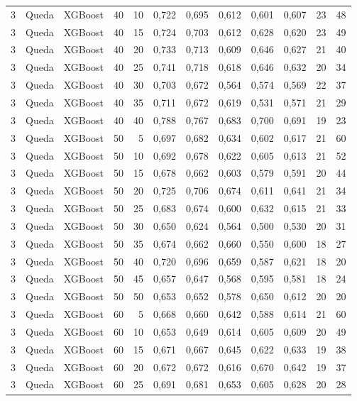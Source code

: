 \begin{longtable}{@{}rllrrrrrrrrr@{}}
3 & Queda & XGBoost & 40 & 10 & 0,722 & 0,695 & 0,612 & 0,601 & 0,607 & 23 & 48 \\
3 & Queda & XGBoost & 40 & 15 & 0,724 & 0,703 & 0,612 & 0,628 & 0,620 & 23 & 49 \\
3 & Queda & XGBoost & 40 & 20 & 0,733 & 0,713 & 0,609 & 0,646 & 0,627 & 21 & 40 \\
3 & Queda & XGBoost & 40 & 25 & 0,741 & 0,718 & 0,618 & 0,646 & 0,632 & 20 & 34 \\
3 & Queda & XGBoost & 40 & 30 & 0,703 & 0,672 & 0,564 & 0,574 & 0,569 & 22 & 37 \\
3 & Queda & XGBoost & 40 & 35 & 0,711 & 0,672 & 0,619 & 0,531 & 0,571 & 21 & 29 \\
3 & Queda & XGBoost & 40 & 40 & 0,788 & 0,767 & 0,683 & 0,700 & 0,691 & 19 & 23 \\
3 & Queda & XGBoost & 50 & 5 & 0,697 & 0,682 & 0,634 & 0,602 & 0,617 & 21 & 60 \\
3 & Queda & XGBoost & 50 & 10 & 0,692 & 0,678 & 0,622 & 0,605 & 0,613 & 21 & 52 \\
3 & Queda & XGBoost & 50 & 15 & 0,678 & 0,662 & 0,603 & 0,579 & 0,591 & 20 & 44 \\
3 & Queda & XGBoost & 50 & 20 & 0,725 & 0,706 & 0,674 & 0,611 & 0,641 & 21 & 34 \\
3 & Queda & XGBoost & 50 & 25 & 0,683 & 0,674 & 0,600 & 0,632 & 0,615 & 21 & 33 \\
3 & Queda & XGBoost & 50 & 30 & 0,650 & 0,624 & 0,564 & 0,500 & 0,530 & 20 & 31 \\
3 & Queda & XGBoost & 50 & 35 & 0,674 & 0,662 & 0,660 & 0,550 & 0,600 & 18 & 27 \\
3 & Queda & XGBoost & 50 & 40 & 0,720 & 0,696 & 0,659 & 0,587 & 0,621 & 18 & 20 \\
3 & Queda & XGBoost & 50 & 45 & 0,657 & 0,647 & 0,568 & 0,595 & 0,581 & 18 & 24 \\
3 & Queda & XGBoost & 50 & 50 & 0,653 & 0,652 & 0,578 & 0,650 & 0,612 & 20 & 20 \\
3 & Queda & XGBoost & 60 & 5 & 0,668 & 0,660 & 0,642 & 0,588 & 0,614 & 21 & 60 \\
3 & Queda & XGBoost & 60 & 10 & 0,653 & 0,649 & 0,614 & 0,605 & 0,609 & 20 & 49 \\
3 & Queda & XGBoost & 60 & 15 & 0,671 & 0,667 & 0,645 & 0,622 & 0,633 & 19 & 38 \\
3 & Queda & XGBoost & 60 & 20 & 0,672 & 0,672 & 0,616 & 0,670 & 0,642 & 19 & 37 \\
3 & Queda & XGBoost & 60 & 25 & 0,691 & 0,681 & 0,653 & 0,605 & 0,628 & 20 & 28 \\

\end{longtable}
